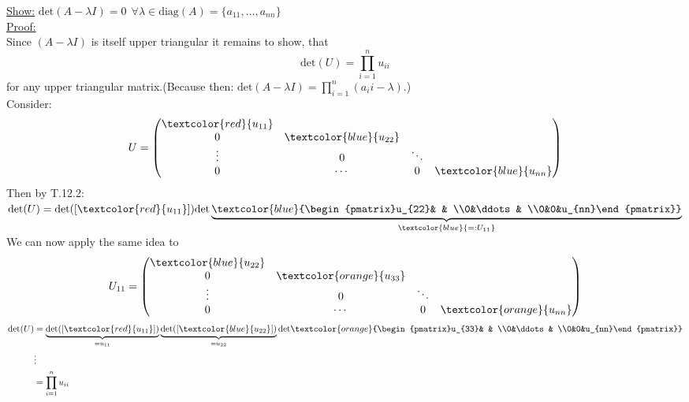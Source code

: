 {\color{solution}
\underline{Show:} 
$\text{det}(A-\lambda I)=0~~\forall\lambda\in\text{diag}(A)=\{a_{11},\dots,a_{nn}\}$\\
\underline{Proof:}\\
Since $(A-\lambda I)$ is itself upper triangular it remains to show, that 
$$
\text{det}(U)=\prod_{i=1}^{n}u_{ii}
$$ 
for any upper triangular matrix.(Because then: $\text{det}(A-\lambda I)=\prod_{i=1}^{n}(a_ii-\lambda)$.)\\
Consider:
$$
U=\begin{pmatrix}\textcolor{red}{u_{11}}& & & \\0&\textcolor{blue}{u_{22}}& & \\\vdots&0&\ddots& \\0&\cdots&0&\textcolor{blue}{u_{nn}}\end{pmatrix}
$$
Then by T.12.2: $\text{det}(U)=\text{det}([\textcolor{red}{u_{11}}])\text{det}\underbrace{\textcolor{blue}{\begin{pmatrix}u_{22}& & \\0&\ddots& \\0&0&u_{nn}\end{pmatrix}}}_{\textcolor{blue}{=:U_{11}}}$\\
We can now apply the same idea to
$$
U_{11}=\begin{pmatrix}\textcolor{blue}{u_{22}}& & & \\0&\textcolor{orange}{u_{33}}& & \\\vdots&0&\ddots& \\0&\cdots&0&\textcolor{orange}{u_{nn}}\end{pmatrix}
$$
\begin{align*}
\text{det}(U)&=\underbrace{\text{det}([\textcolor{red}{u_{11}}])}_{=u_{11}}\underbrace{\text{det}([\textcolor{blue}{u_{22}}])}_{=u_{22}}\text{det}\textcolor{orange}{\begin{pmatrix}u_{33}& & \\0&\ddots& \\0&0&u_{nn}\end{pmatrix}}\\&\vdots\\&=\prod_{i=1}^{n}u_{ii}
\end{align*}
}